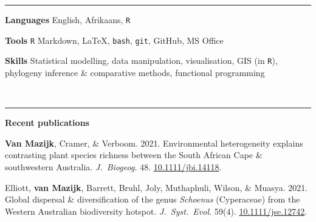 \documentclass[12pt]{article}
\begin{document}
\hrule %

\bigskip

\textbf{Languages}     \hfill                  English, Afrikaans, \texttt{R}

\textbf{Tools    }     \hfill                            \texttt{R} Markdown,
                                        {\selectfont \LaTeX},
                               \texttt{bash}, \texttt{git}, GitHub, MS Office

\textbf{Skills  }      \hfill Statistical modelling, data manipulation, visualisation, GIS (in \texttt{R}), \\
                       \hfill phylogeny inference \& comparative methods, functional programming

\

\hrule %

\bigskip

\textbf{Recent publications}

\vskip5pt

\textbf{Van Mazijk}, Cramer, \& Verboom. 2021.  Environmental heterogeneity explains contrasting plant species richness between the South African Cape \& southwestern Australia. \textit{J.~Biogeog.} 48. \href{https://doi.org/10.1111/jbi.14118}{10.1111/jbi.14118}.

Elliott, \textbf{van Mazijk}, Barrett, Bruhl, Joly, Muthaphuli, Wilson, \& Muasya. 2021. Global dispersal \& diversification of the genus \textit{Schoenus} (Cyperaceae) from the Western Australian biodiversity hotspot. \textit{J.~Syst.~Evol.} 59(4). \href{https://doi.org/10.1111/jse.1274}{10.1111/jse.12742}.
\end{document}
